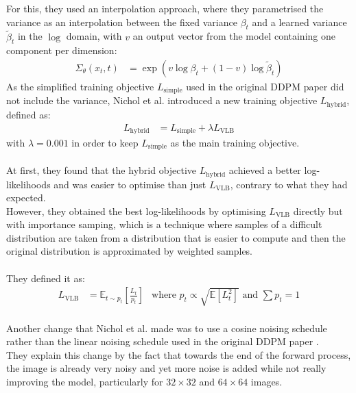 \documentclass[twoside]{article}
\numberwithin{equation}{section}
\numberwithin{figure}{section}
\begin{document}
For this, they used an interpolation approach, where they parametrised the variance as an interpolation between the fixed variance $\beta_t$ and a learned variance $\tilde{\beta}_t$ in the $\log$ domain, with $v$ an output vector from the model containing one component per dimension:
\begin{align}
  \Sigma_\theta (x_t, t) &= \exp \left( v \log \beta_t + (1 - v) \log \tilde{\beta}_t \right)
\end{align}
As the simplified training objective $L_{\text{simple}}$ used in the original DDPM paper \cite{ho2020denoising} did not include the variance, Nichol et al. \cite{nichol2021improved} introduced a new training objective $L_{\text{hybrid}}$, defined as:
\begin{align}
  L_{\text{hybrid}} &= L_{\text{simple}} + \lambda L_{\text{VLB}}
\end{align}
with $\lambda = 0.001$ in order to keep $L_{\text{simple}}$ as the main training objective. \cite{nichol2021improved}
\\\\
At first, they found that the hybrid objective $L_{\text{hybrid}}$ achieved a better log-likelihoods and was easier to optimise than just $L_{\text{VLB}}$, contrary to what they had expected. \cite{nichol2021improved} \\
However, they obtained the best log-likelihoods by optimising $L_{\text{VLB}}$ directly but with importance samping, which is a technique where samples of a difficult distribution are taken from a distribution that is easier to compute and then the original distribution is approximated by weighted samples. \cite{nichol2021improved}
\\\\
They defined it as:
\begin{align}
  L_{\text{VLB}} &= \mathbb{E}_{t \sim p_t} \left[ \frac{L_t}{p_t} \right]
  &\text{where } p_t \propto \sqrt{\mathbb{E}\left[ L_t^2 \right]} \text{ and } \sum p_t = 1
\end{align}
\\
Another change that Nichol et al. \cite{nichol2021improved} made was to use a cosine noising schedule rather than the linear noising schedule used in the original DDPM paper \cite{ho2020denoising}. \\
They explain this change by the fact that towards the end of the forward process, the image is already very noisy and yet more noise is added while not really improving the model, particularly for $32 \times 32$ and $64 \times 64$ images. \cite{nichol2021improved} \\
\end{document}
